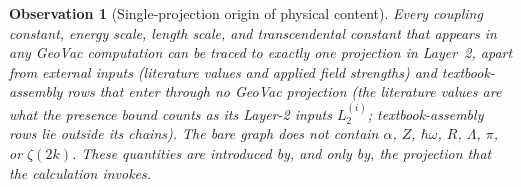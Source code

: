 \documentclass[11pt]{article}
\newtheorem{observation}{Observation}
\begin{document}
\begin{observation}[Single-projection origin of physical content]
\label{obs:single_origin}
Every coupling constant, energy scale, length scale, and
transcendental constant that appears in any GeoVac computation can
be traced to exactly one projection in Layer~2, apart from external
inputs (literature values and applied field strengths) and
textbook-assembly rows that enter through no GeoVac projection (the
literature values are what the presence bound counts as its Layer-2
inputs $L_2^{(i)}$; textbook-assembly rows lie outside its chains).  The bare graph
does not contain $\alpha$, $Z$, $\hbar\omega$, $R$, $\Lambda$, $\pi$,
or $\zeta(2k)$.  These quantities are introduced by, and only by,
the projection that the calculation invokes.
\end{observation}
\end{document}
